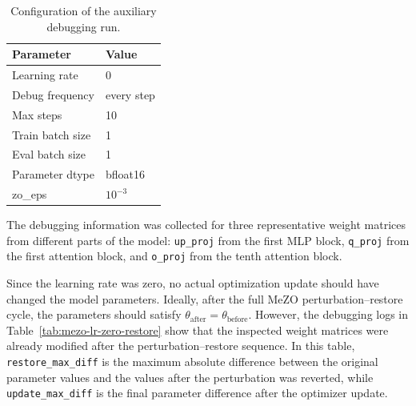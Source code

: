 \documentclass{article}
\begin{document}
\begin{table}[ht]
\centering
\begin{tabular}{ll}
\toprule
Parameter & Value \\
\midrule
Learning rate & 0 \\
Debug frequency & every step \\
Max steps & 10 \\
Train batch size & 1 \\
Eval batch size & 1 \\
Parameter dtype & bfloat16 \\
zo\_eps & $10^{-3}$ \\
\bottomrule
\end{tabular}
\caption{Configuration of the auxiliary debugging run.}
\end{table}

The debugging information was collected for three representative weight matrices from different parts of the model: \texttt{up\_proj} from the first MLP block, \texttt{q\_proj} from the first attention block, and \texttt{o\_proj} from the tenth attention block.

Since the learning rate was zero, no actual optimization update should have changed the model parameters. Ideally, after the full MeZO perturbation--restore cycle, the parameters should satisfy $\theta_{\mathrm{after}}=\theta_{\mathrm{before}}$. However, the debugging logs in Table~\ref{tab:mezo-lr-zero-restore} show that the inspected weight matrices were already modified after the perturbation--restore sequence. In this table, \texttt{restore\_max\_diff} is the maximum absolute difference between the original parameter values and the values after the perturbation was reverted, while \texttt{update\_max\_diff} is the final parameter difference after the optimizer update.
\end{document}
